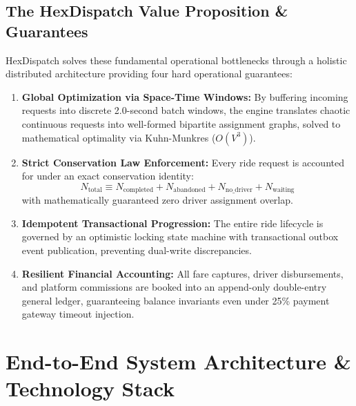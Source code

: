 \documentclass[11pt,a4paper]{article}
\begin{document}
\subsection{The HexDispatch Value Proposition \& Guarantees}
HexDispatch solves these fundamental operational bottlenecks through a holistic distributed architecture providing four hard operational guarantees:
\begin{enumerate}[leftmargin=1.5em]
    \item \textbf{Global Optimization via Space-Time Windows:} By buffering incoming requests into discrete 2.0-second batch windows, the engine translates chaotic continuous requests into well-formed bipartite assignment graphs, solved to mathematical optimality via Kuhn-Munkres ($O(V^3)$).
    \item \textbf{Strict Conservation Law Enforcement:} Every ride request is accounted for under an exact conservation identity:
    \begin{equation}
        N_{\text{total}} \equiv N_{\text{completed}} + N_{\text{abandoned}} + N_{\text{no\_driver}} + N_{\text{waiting}}
    \end{equation}
    with mathematically guaranteed zero driver assignment overlap.
    \item \textbf{Idempotent Transactional Progression:} The entire ride lifecycle is governed by an optimistic locking state machine with transactional outbox event publication, preventing dual-write discrepancies.
    \item \textbf{Resilient Financial Accounting:} All fare captures, driver disbursements, and platform commissions are booked into an append-only double-entry general ledger, guaranteeing balance invariants even under 25\% payment gateway timeout injection.
\end{enumerate}

\section{End-to-End System Architecture \& Technology Stack}
\end{document}
